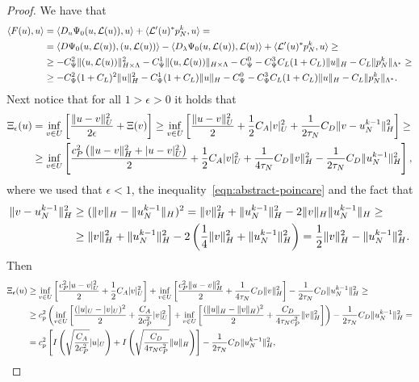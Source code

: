 \documentclass[a4paper,10pt,twoside]{amsbook}
\numberwithin{section}{chapter}
\numberwithin{equation}{chapter}
\theoremstyle{definition}
\DeclarePairedDelimiter{\norm}{\lVert}{\rVert}
\DeclarePairedDelimiter{\dual}{\langle}{\rangle}
\begin{document}
\begin{proof}
We have that
\[
\begin{split}
\dual{F(u),u}&=\dual{D_u\Psi_0(u,\mathcal{L}(u)),u}+\dual{\mathcal{L}'(u)^*p_N^k,u}=\\
&=\dual{D\Psi_0(u,\mathcal{L}(u)),(u,\mathcal{L}(u))}-\dual{D_\lambda\Psi_0(u,\mathcal{L}(u)),\mathcal{L}(u)}+\dual{\mathcal{L}'(u)^*p_N^k,u}\ge\\
&\ge-C_\Psi^2\norm{(u,\mathcal{L}(u))}_{H\times\Lambda}^2-C_\Psi^1\norm{(u,\mathcal{L}(u))}_{H\times\Lambda}-C_\Psi^0-C_\Psi^3C_L(1+C_L)\norm{u}_H-C_L\norm{p_N^k}_{\Lambda^*}\ge\\
&\ge-C_\Psi^2(1+C_L)^2\norm{u}_H^2-C_\Psi^1(1+C_L)\norm{u}_H-C_\Psi^0-C_\Psi^3C_L(1+C_L)\norm{u}_H-C_L\norm{p_N^k}_{\Lambda^*}.
\end{split}
\]
Next notice that for all $1>\epsilon>0$ it holds that
\[
\begin{split}
\Xi_\epsilon(u)&=\inf_{v\in U}\left[\frac{\norm{u-v}_U^2}{2\epsilon}+\Xi(v)\right]\ge\inf_{v\in U}\left[\frac{\norm{u-v}_U^2}{2}+\frac{1}{2}C_A|v|_U^2+\frac{1}{2\tau_N}C_D\norm{v-u_N^{k-1}}_H^2\right]\ge\\
&\ge\inf_{v\in U}\left[\frac{c_P^2\left(\norm{u-v}_H^2+|u-v|_U^2\right)}{2}+\frac{1}{2}C_A|v|_U^2+\frac{1}{4\tau_N}C_D\norm{v}^2_H-\frac{1}{2\tau_N}C_D\norm{u_N^{k-1}}_H^2\right],
\end{split}
\]
where we used that $\epsilon<1$, the inequality~\eqref{eqn:abstract-poincare} and the fact that
\[
\begin{split}
\norm{v-u_N^{k-1}}_H^2&\ge(\norm{v}_H-\norm{u_N^{k-1}}_H)^2=\norm{v}_H^2+\norm{u_N^{k-1}}_H^2-2\norm{v}_H\norm{u_N^{k-1}}_H\ge\\
&\ge\norm{v}_H^2+\norm{u_N^{k-1}}_H^2-2\left(\frac{1}{4}\norm{v}_H^2+\norm{u_N^{k-1}}_H^2\right)=\frac{1}{2}\norm{v}_H^2-\norm{u_N^{k-1}}_H^2.
\end{split}
\]
Then
\[
\begin{split}
\Xi_\epsilon(u)&\ge\inf_{v\in U}\left[\frac{c_P^2|u-v|_U^2}{2}+\frac{1}{2}C_A|v|_U^2\right]+\inf_{v\in U}\left[\frac{c_P^2\norm{u-v}_H^2}{2}+\frac{1}{4\tau_N}C_D\norm{v}_H^2\right]-\frac{1}{2\tau_N}C_D\norm{u_N^{k-1}}_H^2\ge\\
&\ge c_p^2\left(\inf_{v\in U}\left[\frac{(|u|_U-|v|_U)^2}{2}+\frac{C_A}{2c_P^2}|v|_U^2\right]+\inf_{v\in U}\left[\frac{(\norm{u}_H-\norm{v}_H)^2}{2}+\frac{C_D}{4\tau_Nc_P^2}\norm{v}_H^2\right]\right)-\frac{1}{2\tau_N}C_D\norm{u_N^{k-1}}_H^2=\\
&=c_p^2\left[I\left(\sqrt{\frac{C_A}{2c_P^2}}|u|_U\right)+I\left(\sqrt{\frac{C_D}{4\tau_Nc_P^2}}\norm{u}_H\right)\right]-\frac{1}{2\tau_N}C_D\norm{u_N^{k-1}}_H^2,

\end{split}\]
\end{proof}
\end{document}
